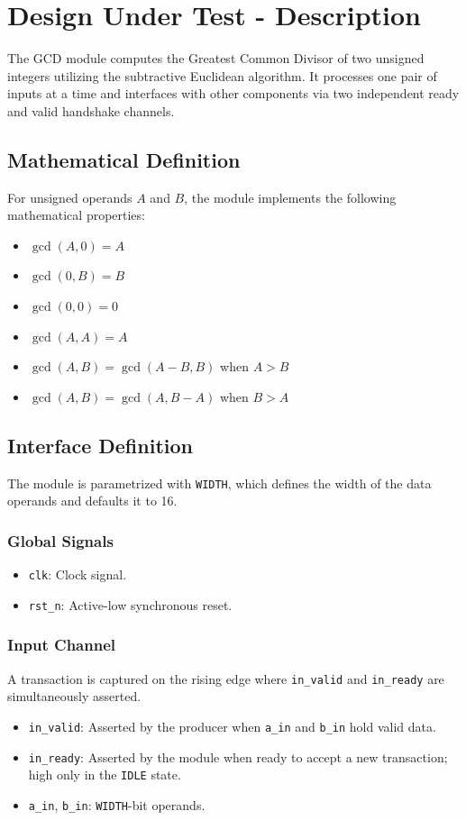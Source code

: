 \section{Design Under Test - Description}
The GCD module computes the Greatest Common Divisor of two unsigned integers utilizing the subtractive Euclidean algorithm. It processes one pair of inputs at a time and interfaces with other components via two independent ready and valid handshake channels.

\subsection{Mathematical Definition}
For unsigned operands $A$ and $B$, the module implements the following mathematical properties:
\begin{itemize}
    \item $\gcd(A, 0) = A$
    \item $\gcd(0, B) = B$
    \item $\gcd(0, 0) = 0$
    \item $\gcd(A, A) = A$
    \item $\gcd(A, B) = \gcd(A-B, B)$ when $A > B$
    \item $\gcd(A, B) = \gcd(A, B-A)$ when $B > A$
\end{itemize}

\subsection{Interface Definition}
The module is parametrized with \texttt{WIDTH}, which defines the width of the data operands and defaults it to 16.

\subsubsection{Global Signals}
\begin{itemize}
    \item \texttt{clk}: Clock signal.
    \item \texttt{rst\_n}: Active-low synchronous reset.
\end{itemize}

\subsubsection{Input Channel}
A transaction is captured on the rising edge where \texttt{in\_valid} and \texttt{in\_ready} are simultaneously asserted.
\begin{itemize}
    \item \texttt{in\_valid}: Asserted by the producer when \texttt{a\_in} and \texttt{b\_in} hold valid data.
    \item \texttt{in\_ready}: Asserted by the module when ready to accept a new transaction; high only in the \texttt{IDLE} state.
    \item \texttt{a\_in}, \texttt{b\_in}: \texttt{WIDTH}-bit operands.
\end{itemize}

